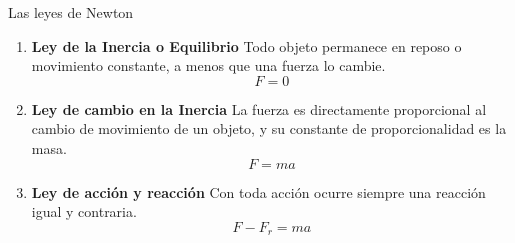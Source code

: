\begin{infocard}{Las leyes de Newton}
    \begin{enumerate}
        \item \textbf{Ley de la Inercia o Equilibrio} Todo objeto permanece en reposo o movimiento constante, a menos que una fuerza lo cambie. \[F=0\]
        \item \textbf{Ley de cambio en la Inercia} La fuerza es directamente proporcional al cambio de movimiento de un objeto, y su constante de proporcionalidad es la masa.\[F=ma\]
        \item \textbf{Ley de acción y reacción} Con toda acción ocurre siempre una reacción igual y contraria. \[F-F_r=ma\]
    \end{enumerate}
\end{infocard}

